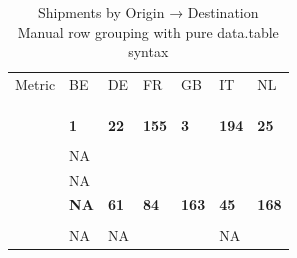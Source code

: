 \documentclass[
  american,
  10,
  a4paper,
]{book}
\theoremstyle{definition}
\theoremstyle{remark}
\begin{document}
\begin{table}
\caption*{
{\large Shipments by Origin → Destination} \\ 
{\small Manual row grouping with pure data.table syntax}
} 
\fontsize{12.0pt}{14.4pt}\selectfont
\begin{tabular*}{\linewidth}{@{\extracolsep{\fill}}>{\raggedright\arraybackslash}p{\dimexpr 90.00pt -2\tabcolsep-1.5\arrayrulewidth}>{\centering\arraybackslash}p{\dimexpr 60.00pt -2\tabcolsep-1.5\arrayrulewidth}>{\centering\arraybackslash}p{\dimexpr 60.00pt -2\tabcolsep-1.5\arrayrulewidth}>{\centering\arraybackslash}p{\dimexpr 60.00pt -2\tabcolsep-1.5\arrayrulewidth}>{\centering\arraybackslash}p{\dimexpr 60.00pt -2\tabcolsep-1.5\arrayrulewidth}>{\centering\arraybackslash}p{\dimexpr 60.00pt -2\tabcolsep-1.5\arrayrulewidth}>{\centering\arraybackslash}p{\dimexpr 60.00pt -2\tabcolsep-1.5\arrayrulewidth}}
\toprule
 & \multicolumn{6}{>{\centering\arraybackslash}m{\dimexpr 360.00pt -2\tabcolsep-1.5\arrayrulewidth}}{TO} \\ 
\cmidrule(lr){2-7}
Metric & BE & DE & FR & GB & IT & NL \\ 
\midrule\addlinespace[2.5pt]
\multicolumn{7}{>{\raggedright\arraybackslash}m{450pt}}{{\bfseries \cellcolor[HTML]{F8F9FA}{IT}}} \\[2.5pt] 
\midrule\addlinespace[2.5pt]
{\itshape Average Items} & 1.0 & 22.0 & 155.0 & 3.0 & 194.0 & 25.0 \\ 
{\itshape Count (n)} & 1 & 1 & 1 & 1 & 1 & 1 \\ 
{\itshape Max Items} & {\bfseries 1} & {\bfseries 22} & {\bfseries 155} & {\bfseries 3} & {\bfseries 194} & {\bfseries 25} \\ 
\midrule\addlinespace[2.5pt]
\multicolumn{7}{>{\raggedright\arraybackslash}m{450pt}}{{\bfseries \cellcolor[HTML]{F8F9FA}{GB}}} \\[2.5pt] 
\midrule\addlinespace[2.5pt]
{\itshape Average Items} & NA & 61.0 & 84.0 & 163.0 & 23.5 & 85.5 \\ 
{\itshape Count (n)} & NA & 1 & 1 & 1 & 2 & 2 \\ 
{\itshape Max Items} & {\bfseries NA} & {\bfseries 61} & {\bfseries 84} & {\bfseries 163} & {\bfseries 45} & {\bfseries 168} \\ 
\midrule\addlinespace[2.5pt]
\multicolumn{7}{>{\raggedright\arraybackslash}m{450pt}}{{\bfseries \cellcolor[HTML]{F8F9FA}{FR}}} \\[2.5pt] 
\midrule\addlinespace[2.5pt]
{\itshape Average Items} & NA & NA & 152.0 & 4.0 & NA & 10.0 \\ 

\end{tabular*}
\end{table}
\end{document}
